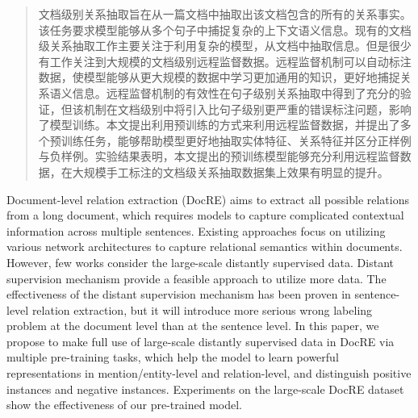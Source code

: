 

\begin{abstract}
  文档级别关系抽取旨在从一篇文档中抽取出该文档包含的所有的关系事实。该任务要求模型能够从多个句子中捕捉复杂的上下文语义信息。现有的文档级关系抽取工作主要关注于利用复杂的模型，从文档中抽取信息。但是很少有工作关注到大规模的文档级别远程监督数据。远程监督机制可以自动标注数据，使模型能够从更大规模的数据中学习更加通用的知识，更好地捕捉关系语义信息。远程监督机制的有效性在句子级别关系抽取中得到了充分的验证，但该机制在文档级别中将引入比句子级别更严重的错误标注问题，影响了模型训练。本文提出利用预训练的方式来利用远程监督数据，并提出了多个预训练任务，能够帮助模型更好地抽取实体特征、关系特征并区分正样例与负样例。实验结果表明，本文提出的预训练模型能够充分利用远程监督数据，在大规模手工标注的文档级关系抽取数据集上效果有明显的提升。


\end{abstract}

\begin{abstract*}
  Document-level relation extraction (DocRE) aims to extract all possible relations from a long document, which requires models to capture complicated contextual information across multiple sentences. Existing approaches focus on utilizing various network architectures to capture relational semantics within documents. However, few works consider the large-scale distantly supervised data. Distant supervision mechanism provide a feasible approach to utilize more data. The effectiveness of the distant supervision mechanism has been proven in sentence-level relation extraction, but it will introduce more serious wrong labeling problem at the document level than at the sentence level. In this paper, we propose to make full use of large-scale distantly supervised data in DocRE via multiple pre-training tasks, which help the model to learn powerful representations in mention/entity-level and relation-level, and distinguish positive instances and negative instances. Experiments on the large-scale DocRE dataset show the effectiveness of our pre-trained model.
\end{abstract*}
